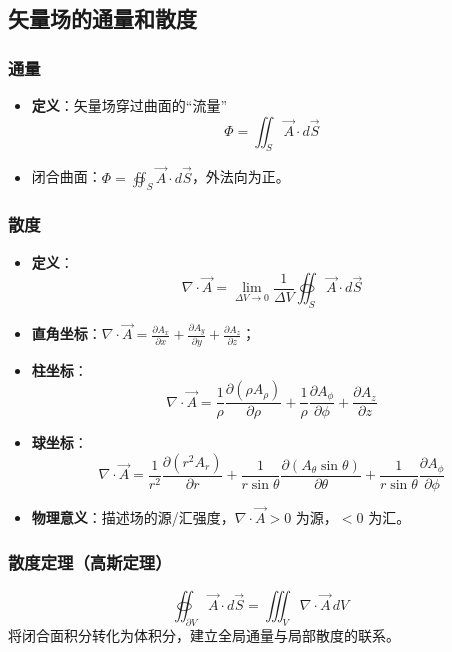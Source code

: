\subsection{矢量场的通量和散度}
\subsubsection{通量}
\begin{itemize}
    \item \textbf{定义}：矢量场穿过曲面的“流量”
    \[
    \varPhi = \iint_{S} \vec{A} \cdot d\vec{S}
    \]
    \item 闭合曲面：$\displaystyle \varPhi = \oiint_{S} \vec{A} \cdot d\vec{S}$，外法向为正。
\end{itemize}

\subsubsection{散度}
\begin{itemize}
    \item \textbf{定义}：
    \[
    \nabla \cdot \vec{A} = \lim_{\Delta V \to 0} \frac{1}{\Delta V}\oiint_{S} \vec{A} \cdot d\vec{S}
    \]
    \item \textbf{直角坐标}：$\displaystyle \nabla \cdot \vec{A} = \frac{\partial A_x}{\partial x} + \frac{\partial A_y}{\partial y} + \frac{\partial A_z}{\partial z}$；
    \item \textbf{柱坐标}：
    \[
    \nabla \cdot \vec{A} = \frac{1}{\rho} \frac{\partial (\rho A_\rho)}{\partial \rho} + \frac{1}{\rho} \frac{\partial A_\phi}{\partial \phi} + \frac{\partial A_z}{\partial z}
    \]
    \item \textbf{球坐标}：
    \[
    \nabla \cdot \vec{A} = \frac{1}{r^2} \frac{\partial (r^2 A_r)}{\partial r} 
    + \frac{1}{r \sin\theta} \frac{\partial (A_\theta \sin\theta)}{\partial \theta} 
    + \frac{1}{r \sin\theta} \frac{\partial A_\phi}{\partial \phi}
    \]
    \item \textbf{物理意义}：描述场的源/汇强度，$\nabla\cdot\vec{A}>0$ 为源，$<0$ 为汇。
\end{itemize}

\subsubsection{散度定理（高斯定理）}
\[
\oiint_{\partial V} \vec{A} \cdot d\vec{S} = \iiint_V \nabla \cdot \vec{A} \, dV
\]
将闭合面积分转化为体积分，建立全局通量与局部散度的联系。

